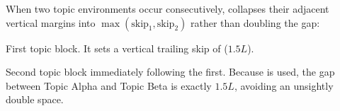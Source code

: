 \documentclass[paper=a4, fontsize=9]{habshe-tufte}
\begin{document}

When two topic environments occur consecutively, \texttt{\string\addvspace} collapses their adjacent vertical margins into $\max(\text{skip}_1, \text{skip}_2)$ rather than doubling the gap:

\begin{topic}
  First topic block. It sets a vertical trailing skip of \texttt{\string\habshe@topicskip} ($1.5L$).
\end{topic}
\begin{topic}
  Second topic block immediately following the first. Because \texttt{\string\addvspace} is used, the gap between Topic Alpha and Topic Beta is exactly $1.5L$, avoiding an unsightly double space.
\end{topic}
\end{document}
